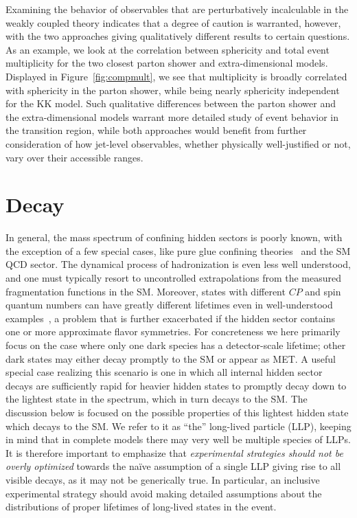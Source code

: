 Examining the behavior of observables that are perturbatively incalculable in the weakly coupled theory indicates that a degree of caution is warranted, however, with the two approaches giving qualitatively different results to certain questions. As an example, we look at the correlation between sphericity and total event multiplicity for the two closest parton shower and extra-dimensional models. Displayed in Figure~\ref{fig:compmult}, we see that multiplicity is broadly correlated with sphericity in the parton shower, while being nearly sphericity independent for the KK model. Such qualitative differences between the parton shower and the extra-dimensional models warrant more detailed study of event behavior in the transition region, while both approaches would benefit from further consideration of how jet-level observables, whether physically well-justified or not, vary over their accessible ranges.

\section{Decay}
\label{sec:darkshowerdk}

In general, the mass spectrum of confining hidden sectors is poorly known, with the exception of a few special cases, like pure glue confining theories~\cite{Morningstar:1999rf} and the SM QCD sector. The dynamical process of hadronization is even less well understood, and one must typically resort to uncontrolled extrapolations from the measured fragmentation functions in the SM. Moreover,  states with different $CP$ and spin  quantum numbers  can have greatly different lifetimes even in well-understood examples~\cite{Strassler:2006im,Juknevich:2009ji,Juknevich:2009gg}, a problem that is further exacerbated if the hidden sector contains one or more approximate flavor symmetries. For concreteness we here primarily focus on the case where only one dark species has a detector-scale lifetime; other dark states may either decay promptly to the SM or appear as MET.
A useful special case realizing this scenario is one in which all internal hidden sector decays are sufficiently rapid for heavier hidden states to promptly decay down to the lightest state in the spectrum, which in turn decays to the SM. The discussion below is focused on the possible properties of this lightest hidden state which decays to the SM. We refer to it as ``the'' long-lived particle (LLP), keeping in mind that in complete models there may very well be multiple species of LLPs. It is therefore important to emphasize that \emph{experimental strategies should not be overly optimized} towards the na\"ive assumption of a single LLP giving rise to all visible decays, as it may not be generically true. In particular, an inclusive experimental strategy should avoid making detailed assumptions about the distributions of proper lifetimes of long-lived states in the event.

